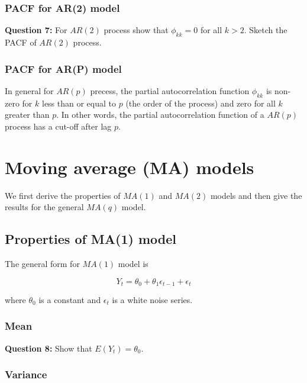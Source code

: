\documentclass[
  11pt,
  a4paper,
]{report}
\begin{document}
\subsection{PACF for AR(2) model}\label{pacf-for-ar2-model}

\textbf{Question 7:} For \(AR(2)\) process show that \(\phi_{kk}=0\) for
all \(k>2\). Sketch the PACF of \(AR(2)\) process.

\subsection{PACF for AR(P) model}\label{pacf-for-arp-model}

In general for \(AR(p)\) precess, the partial autocorrelation function
\(\phi_{kk}\) is non-zero for \(k\) less than or equal to \(p\) (the
order of the process) and zero for all \(k\) greater than \(p\). In
other words, the partial autocorrelation function of a \(AR(p)\) process
has a cut-off after lag \(p\).


\chapter{Moving average (MA) models}\label{moving-average-ma-models}

We first derive the properties of \(MA(1)\) and \(MA(2)\) models and
then give the results for the general \(MA(q)\) model.

\section{Properties of MA(1) model}\label{properties-of-ma1-model}

The general form for \(MA(1)\) model is

\begin{equation}
  \label{eq:ma1}
Y_t = \theta_0 + \theta_1 \epsilon_{t-1} + \epsilon_t
\end{equation}

where \(\theta_0\) is a constant and \({\epsilon_t}\) is a white noise
series.

\subsection{Mean}\label{mean-3}

\textbf{Question 8:} Show that \(E(Y_t) = \theta_0\).

\subsection{Variance}\label{variance-2}
\end{document}
